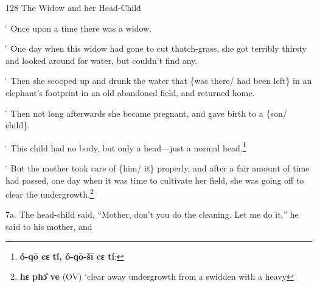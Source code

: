 
128 The Widow and her Head-Child

\. Once upon a time there was a widow.

\. One day when this widow had gone to cut thatch-grass, she got terribly thirsty
and looked around for water, but couldn't find any.

\. Then she scooped up and drunk the water that \{was there/ had been left\} in
an elephant's footprint in an old abandoned field, and returned home.

\. Then not long afterwards she became pregnant, and gave birth to a \{son/ child\}.

\. This child had no body, but only a head---just a normal head.\footnote{\textbf{ó-qō cɛ tí, ó-qō-šī cɛ tí}:}

\. But the mother took care of \{him/ it\} properly, and after a fair amount of
time had passed, one day when it was time to cultivate her field, she was going
off to clear the undergrowth.\footnote{\textbf{hɛ phɔ̂ ve }(OV) `clear away undergrowth from a swidden with a heavy}

7a. The head-child said, ``Mother, don't you do the cleaning. Let me do it,'' he
said to his mother, and


